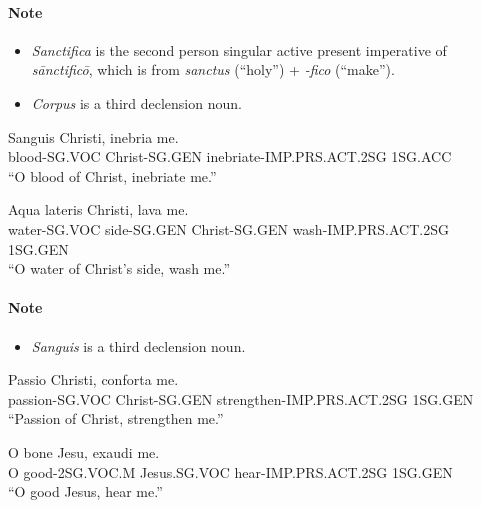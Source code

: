 \documentclass[a4paper]{article}
\begin{document}
\paragraph{Note} \begin{itemize}
    \item \emph{Sanctifica} is the second person singular active present imperative of \emph{sānctificō}, which is from \emph{sanctus} (``holy'') + \emph{-fico} (``make'').
    \item \emph{Corpus} is a third declension noun.
\end{itemize}

\begin{exe}

\sn
\gll Sanguis       Christi,       inebria                   me. \\
     blood-SG.VOC  Christ-SG.GEN  inebriate-IMP.PRS.ACT.2SG 1SG.ACC \\
\glt ``O blood of Christ, inebriate me.''

\gll Aqua           lateris      Christi,        lava                   me. \\
     water-SG.VOC   side-SG.GEN  Christ-SG.GEN   wash-IMP.PRS.ACT.2SG   1SG.GEN \\
\glt ``O water of Christ's side, wash me.''
\end{exe}

\paragraph{Note} \begin{itemize}
    \item \emph{Sanguis} is a third declension noun.
\end{itemize}

\begin{exe}

\sn
\gll Passio          Christi,        conforta                       me. \\
     passion-SG.VOC  Christ-SG.GEN   strengthen-IMP.PRS.ACT.2SG     1SG.GEN \\
\glt ``Passion of Christ, strengthen me.''

\sn    
\gll O  bone            Jesu,           exaudi           me.  \\
     O  good-2SG.VOC.M  Jesus.SG.VOC    hear-IMP.PRS.ACT.2SG 1SG.GEN \\
\glt ``O good Jesus, hear me.''
\end{exe}
\end{document}
